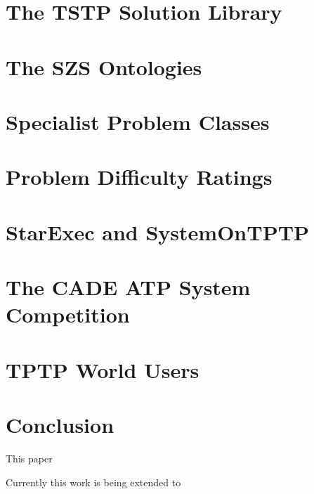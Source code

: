 \documentclass{easychair}
\begin{document}
\section{The TSTP Solution Library}
\label{TSTP}

\section{The SZS Ontologies}
\label{SZS}

\section{Specialist Problem Classes}
\label{SPCs}

\section{Problem Difficulty Ratings}
\label{Ratings}

\section{StarExec and SystemOnTPTP}
\label{StarExec}

\section{The CADE ATP System Competition}
\label{CASC}

\section{TPTP World Users}
\label{Users}

\section{Conclusion}
\label{Conclusion}

This paper 

Currently this work is being extended to 



\end{document}

